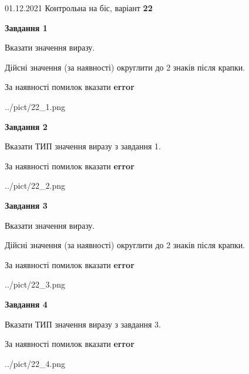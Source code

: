 \documentclass[11pt, ukrainian]{article}
\begin{document}
{01.12.2021 Контрольна на біс, варіант  \No \textbf { 22 }\par}
{
\begin {large}
{\begin {center}\textbf{Завдання 1}\end {center}}\par
Вказати значення виразу. \par
Дійсні значення (за наявності) округлити до 2 знаків після крапки. \par
За наявності помилок вказати \textbf{error}

\begin{center}
	{../pict/22_1.png}
\end{center}
\newpage

{\begin {center}\textbf{Завдання 2}\end {center}}\par
Вказати ТИП значення виразу з завдання 1. \par
За наявності помилок вказати \textbf{error}

\begin{center}
	{../pict/22_2.png}
\end{center}
\newpage

{\begin {center}\textbf{Завдання 3}\end {center}}\par
Вказати значення виразу. \par
Дійсні значення (за наявності) округлити до 2 знаків після крапки. \par
За наявності помилок вказати \textbf{error}

\begin{center}
	{../pict/22_3.png}
\end{center}
\newpage

{\begin {center}\textbf{Завдання 4}\end {center}}\par
Вказати ТИП значення виразу з завдання 3. \par
За наявності помилок вказати \textbf{error}

\begin{center}
	{../pict/22_4.png}
\end{center}
\newpage


\end{large}}
\end{document}

